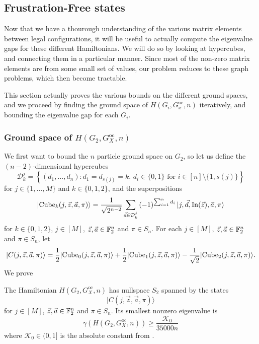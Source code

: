 \documentclass[../thesis-main/thesis-main]{subfiles}
\begin{document}
\subsection{Frustration-Free states}

Now that we have a thourough understanding of the various matrix elements between legal configurations, it will be useful to actually compute the eigenvalue gaps for these different Hamiltonians.  We will do so by looking at hypercubes, and connecting them in a particular manner.  Since most of the non-zero matrix elements are from some small set of values, our problem reduces to these graph problems, which then become tractable. 

This section actually proves the various bounds on the different ground spaces, and we proceed by finding the ground space of $H(G_i,G_x^{\text{oc}},n)$ iteratively, and bounding the eigenvalue gap for each $G_i$.

\subsubsection{Ground space of $H(G_2,G_X^{\text{oc}},n)$}

We first want to bound the $n$ particle ground space on $G_2$, so let us define the $(n-2)$-dimensional hypercubes
\begin{equation}
  \mathcal{D}_{k}^{j}=\left\{ (d_{1},\ldots,d_{n})\colon d_{1}=d_{s(j)}=k,\, d_{i}\in\{0,1\}\text{ for }i\in[n]\setminus\{1,s(j)\}\right\} 
\end{equation}
for $j\in\{1,\ldots,M\}$ and $k\in\{0,1,2\}$, and the superpositions
\begin{equation}
|{\operatorname{Cube}_{k}(j,\vec{z},\vec{a},\pi)}\rangle=\frac{1}{\sqrt{2^{n-2}}}\sum_{\vec{d}\in\mathcal{D}_{k}^{j}}\left(-1\right)^{\sum_{i=1}^{n}d_{i}}|j,\vec{d},\operatorname{In}(\vec{z}),\vec{a},\pi\rangle
\end{equation}
for $k\in\{0,1,2\}$, $j\in[M]$, $\vec{z},\vec{a}\in\mathbb{F}_2^{n}$ and $\pi\in S_n$.  For each $j\in[M]$, $\vec{z},\vec{a}\in\mathbb{F}_2^{n}$ and $\pi\in S_n$, let
\begin{equation}
|C(j,\vec{z},\vec{a},\pi)\rangle=\frac{1}{2}|{\operatorname{Cube}_{0}(j,\vec{z},\vec{a},\pi)}\rangle+\frac{1}{2}|{\operatorname{Cube}_{1}(j,\vec{z},\vec{a},\pi)}\rangle-\frac{1}{\sqrt{2}}|{\operatorname{Cube}_{2}(j,\vec{z},\vec{a},\pi)}\rangle.\label{eq:cubestates-1}
\end{equation}
We prove

\begin{lemma}
\label{lem:beta_bound}The Hamiltonian $H(G_{2},G_X^{\text{oc}},n)$ has nullspace $S_2$ spanned by the states
\begin{equation}
|C(j,\vec{z},\vec{a},\pi)\rangle
\end{equation}
for $j\in[M]$, $\vec{z},\vec{a}\in\mathbb{F}_2^{n}$ and $\pi\in S_n$. Its smallest nonzero eigenvalue is 
\begin{equation}
  \gamma(H(G_{2},G_X^{\text{oc}},n)) \geq \frac{\mathcal{K}_0}{35000n}
\end{equation}
where $\mathcal{K}_0\in (0,1]$ is the absolute constant from .
\end{lemma}
\end{document}
